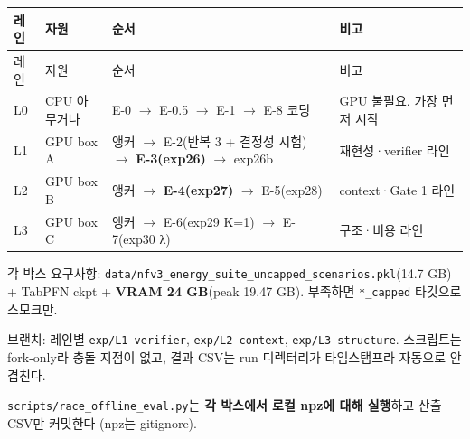 \begingroup
\footnotesize
\begin{longtable}{>{\raggedright\arraybackslash}p{}>{\raggedright\arraybackslash}p{}>{\raggedright\arraybackslash}p{}>{\raggedright\arraybackslash}p{}}
\toprule
레인 & 자원 & 순서 & 비고 \\ \midrule
\endfirsthead
레인 & 자원 & 순서 & 비고 \\ \midrule
\endhead
{}L0 & CPU 아무거나 & E-0  \ensuremath{\rightarrow}  E-0.5  \ensuremath{\rightarrow}  E-1  \ensuremath{\rightarrow}  E-8 코딩 & GPU 불필요. 가장 먼저 시작 \\
{}L1 & GPU box A & 앵커  \ensuremath{\rightarrow}  E-2(반복 3 +\allowbreak{} 결정성 시험)  \ensuremath{\rightarrow}  \textbf{E-3(exp26)}  \ensuremath{\rightarrow}  exp26b & 재현성·verifier 라인 \\
{}L2 & GPU box B & 앵커  \ensuremath{\rightarrow}  \textbf{E-4(exp27)}  \ensuremath{\rightarrow}  E-5(exp28) & context·Gate 1 라인 \\
{}L3 & GPU box C & 앵커  \ensuremath{\rightarrow}  E-6(exp29 K=\allowbreak{}1)  \ensuremath{\rightarrow}  E-7(exp30 λ) & 구조·비용 라인 \\
\bottomrule
\end{longtable}
\endgroup
\par\noindent \textbullet\enspace 각 박스 요구사항: \texttt{data/\allowbreak{}\allowbreak{}nfv\allowbreak{}3\_\allowbreak{}\allowbreak{}energy\allowbreak{}\_\allowbreak{}\allowbreak{}suite\_\allowbreak{}\allowbreak{}u\allowbreak{}ncapped\_\allowbreak{}\allowbreak{}scenario\allowbreak{}s.\allowbreak{}pkl}(14.7 GB) +\allowbreak{} TabPFN ckpt +\allowbreak{} \textbf{VRAM 24 GB}(peak 19.47 GB). 부족하면 \texttt{*\_\allowbreak{}\allowbreak{}capped\allowbreak{}} 타깃으로 스모크만.


\par\noindent \textbullet\enspace 브랜치: 레인별 \texttt{exp/\allowbreak{}\allowbreak{}L1-\allowbreak{}v\allowbreak{}erifier}, \texttt{exp/\allowbreak{}\allowbreak{}L2-\allowbreak{}c\allowbreak{}ontext}, \texttt{exp/\allowbreak{}\allowbreak{}L3-\allowbreak{}s\allowbreak{}tructure\allowbreak{}}. 스크립트는 fork-only라 충돌 지점이 없고, 결과 CSV는 run 디렉터리가 타임스탬프라 자동으로 안 겹친다.


\par\noindent \textbullet\enspace \texttt{scripts/\allowbreak{}\allowbreak{}race\_\allowbreak{}\allowbreak{}off\allowbreak{}line\_\allowbreak{}\allowbreak{}eva\allowbreak{}l.\allowbreak{}py}는 \textbf{각 박스에서 로컬 npz에 대해 실행}하고 산출 CSV만 커밋한다 (npz는 gitignore).


